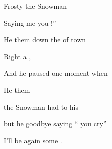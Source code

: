 \begin{SBSong}{Frosty the Snowman}
\begin{SBVerse}
    Saying  me  you !'' 
  \end{SBVerse}
  \begin{SBVerse}
    He  them down the  of town
    
    Right  a  ,
    
    And he  paused one moment when
    
    He  them  
  \end{SBVerse}
  \begin{SBVerse}
     the Snowman had to   his 

    but he  goodbye saying `` you cry''

    I'll be  again some . 
  \end{SBVerse} 
\end{SBSong}
